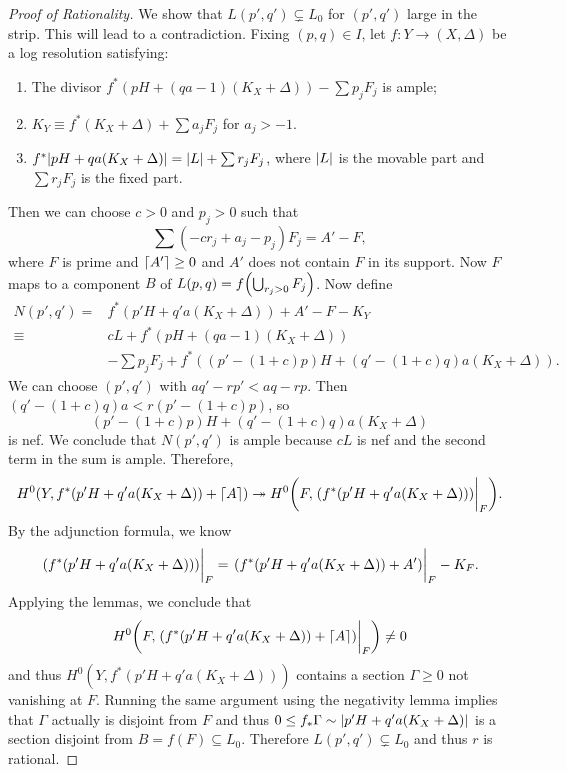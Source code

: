 \documentclass[leqno, openany]{memoir}
\DeclarePairedDelimiter{\ceil}{\lceil}{\rceil}
\theoremstyle{definition}
\theoremstyle{remark}
\theoremstyle{plain}
\theoremstyle{definition}
\theoremstyle{remark}
\begin{document}
\begin{proof}[Proof of Rationality]
    We show that $L(p', q') \subsetneq L_0$ for $(p', q')$ large in the strip. This will lead to a contradiction. Fixing $(p,q) \in I$, let $f \colon Y \to (X, \Delta)$ be a log resolution satisfying:
    \begin{enumerate}
        \item The divisor $f^* (pH + (qa-1)(K_X + \Delta)) - \sum p_j F_j$ is ample;
        \item $K_Y \equiv f^*(K_X + \Delta) + \sum a_j F_j$ for $a_j > -1$.
        \item $f^* \abs{pH + qa (K_X + \Delta)} = \abs{L} + \sum r_j F_j$, where $\abs{L}$ is the movable part and $\sum r_j F_j$ is the fixed part.
    \end{enumerate}
    Then we can choose $c > 0$ and $p_j > 0$ such that 
    \[ \sum (-c r_j + a_j - p_j) F_j = A' - F, \]
    where $F$ is prime and $\ceil{A'} \geq 0$ and $A'$ does not contain $F$ in its support. Now $F$ maps to a component $B$ of $L(p,q) = f\qty(\bigcup_{r_j > 0} F_j)$. Now define
    \begin{align*} 
        N(p', q') ={} &f^*(p' H + q' a (K_X + \Delta)) + A' - F - K_Y \\  
        \equiv{} &cL + f^*(pH + (qa-1)(K_X + \Delta))  \\
                 &- \sum p_j F_j + f^*((p' - (1+c)p)H + (q'-(1+c)q)a(K_X + \Delta)). 
    \end{align*}
    We can choose $(p', q')$ with $aq' - rp' < aq-rp$. Then $(q' - (1+c)q)a < r(p' - (1+c)p)$, so
    \[ (p' - (1+c)p)H + (q' - (1+c)q)a (K_X + \Delta) \]
    is nef. We conclude that $N(p',q')$ is ample because $cL$ is nef and the second term in the sum is ample. Therefore, 
    \[ H^0(Y, f^*(p'H + q'a(K_X + \Delta)) + \ceil{A}) \twoheadrightarrow H^0\qty(F, \eval{ ( f^*(p'H + q'a(K_X + \Delta)) ) }_F). \]
    By the adjunction formula, we know
    \[ \eval{ ( f^*(p'H + q'a(K_X + \Delta)) ) }_F = \eval{(f^*(p'H + q'a(K_X + \Delta)) + A')}_F - K_F. \]
    Applying the lemmas, we conclude that
    \[ H^0\qty(F, \eval{(f^*(p'H + q'a(K_X + \Delta)) + \ceil{A})}_F) \neq 0 \]
    and thus $H^0(Y, f^*(p'H + q'a(K_X + \Delta)))$ contains a section $\Gamma \geq 0$ not vanishing at $F$. Running the same argument using the negativity lemma implies that $\Gamma$ actually is disjoint from $F$ and thus $0 \leq f_* \Gamma \sim \abs{p'H + q'a(K_X + \Delta)}$ is a section disjoint from $B = f(F) \subseteq L_0$. Therefore $L(p', q') \subsetneq L_0$ and thus $r$ is rational.


\end{proof}
\end{document}
